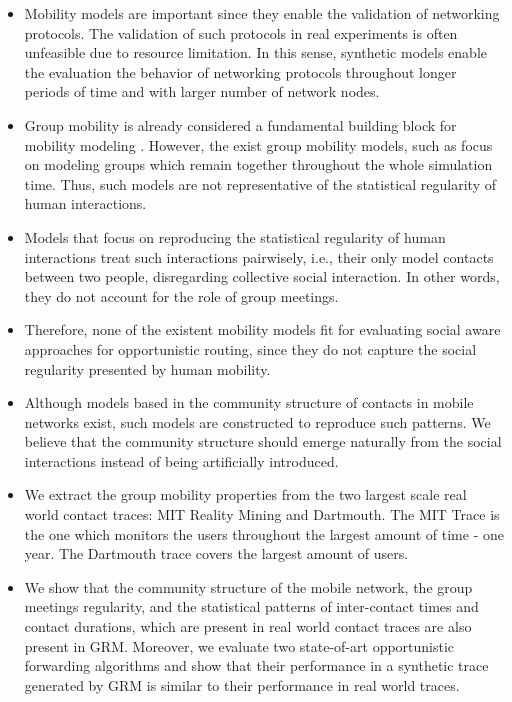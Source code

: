 \documentclass[10pt, conference, letterpaper]{IEEEtran}
\begin{document}
\begin{itemize}
    
    \item Mobility models are important since they enable the validation of networking protocols. The validation of such protocols in real experiments is often unfeasible due  to resource limitation. In this sense, synthetic models enable the evaluation the behavior of networking protocols throughout longer periods of time and with larger number of network nodes. 
    
    \item Group mobility is already considered a fundamental building block for mobility modeling \cite{survey1}. However, the exist group mobility models, such as \cite{group_mob_gerla} focus on modeling groups which remain together throughout the whole simulation time. Thus, such models are not representative of the statistical regularity of human interactions. 
    
    \item Models that focus on reproducing the statistical regularity of human interactions treat such interactions pairwisely, i.e., their only model contacts between two people, disregarding collective social interaction. In other words, they do not account for the role of group meetings.
    
    \item Therefore, none of the existent mobility models fit for evaluating social aware approaches for opportunistic routing, since they do not capture the social regularity presented by human mobility.
    
    \item Although models based in the community structure of contacts in mobile networks exist, such models are constructed to reproduce such patterns. We believe that the community structure should emerge naturally from the social interactions instead of being artificially introduced.
    
    
    \item We extract the group mobility properties from the two largest scale real world contact traces: MIT Reality Mining and Dartmouth. The MIT Trace is the one which monitors the users throughout the largest amount of time - one year. The Dartmouth trace covers the largest amount of users.
    
    \item We show that the community structure of the mobile network, the group meetings regularity, and the statistical patterns of inter-contact times and contact durations, which are present in real world contact traces are also present in GRM. Moreover, we evaluate two state-of-art opportunistic forwarding algorithms and show that their performance in a synthetic trace generated by GRM is similar to their performance in real world traces. 
    
\end{itemize}
\end{document}
